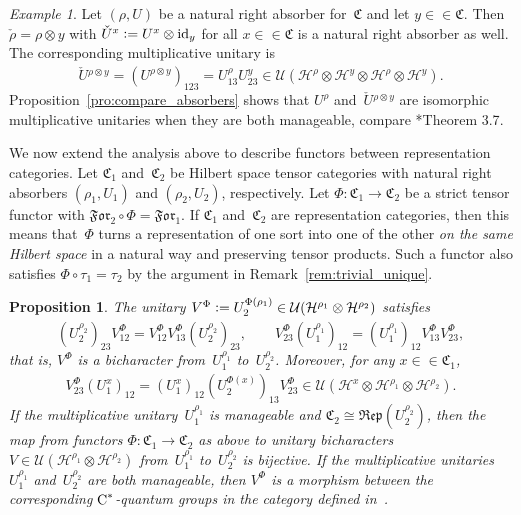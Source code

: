 \documentclass[a4paper]{amsart}
\numberwithin{equation}{section}
\theoremstyle{plain}
\numberwithin{theorem}{section}
\newtheorem{proposition}[theorem]{Proposition}
\theoremstyle{definition}
\theoremstyle{remark}
\newtheorem{example}[theorem]{Example}
\newcommand*{\inOb}{\mathrel{\in\in}}%
\newcommand*{\Cat}{\mathfrak C}     %
\newcommand*{\Corepcat}[1]{\mathfrak{Rep}(#1)}%
\newcommand*{\Forget}{\mathfrak{For}}%
\newcommand*{\Trivial}{\tau}%
\newcommand*{\nb}{\nobreakdash}
\newcommand*{\Id}{\textup{id}}%
\newcommand*{\Cst}{\textup C^*}%
\newcommand*{\Hils}[1][H]{\mathcal{#1}}%
\newcommand*{\U}{\mathcal U}%
\newcommand*{\defeq}{\mathrel{\vcentcolon=}}
\begin{document}
\begin{example}
  Let \((\rho,U)\) be a natural right absorber for~\(\Cat\) and let
  \(y\inOb\Cat\).  Then \(\check\rho = \rho\otimes y\) with
  \(\check{U}{}^x \defeq U^x \otimes \Id_y\) for all \(x\inOb\Cat\)
  is a natural right absorber as well.  The corresponding
  multiplicative unitary is
  \begin{equation}
    \label{eq:stabilise_multunit}
    \check{U}{}^{\rho\otimes y}
    = (U^{\rho\otimes y})^{\phantom1}_{123}
    = U^\rho_{13} U^y_{23}
    \in \U(\Hils^\rho\otimes\Hils^y \otimes \Hils^\rho\otimes\Hils^y).
  \end{equation}
  Proposition~\ref{pro:compare_absorbers} shows that \(U^\rho\)
  and~\(\check{U}{}^{\rho\otimes y}\)
  are isomorphic multiplicative unitaries when they are both
  manageable, compare \cite{Meyer-Roy-Woronowicz:Qgrp_proj}*{Theorem
    3.7}.
\end{example}

We now extend the analysis above to describe functors between
representation categories.
Let \(\Cat_1\)
and~\(\Cat_2\)
be Hilbert space tensor categories with natural right absorbers
\((\rho_1,U_1)\)
and \((\rho_2,U_2)\),
respectively.  Let \(\Phi\colon \Cat_1\to\Cat_2\)
be a strict tensor functor with \(\Forget_2\circ \Phi=\Forget_1\).
If \(\Cat_1\)
and~\(\Cat_2\)
are representation categories, then this means that~\(\Phi\)
turns a representation of one sort into one of the other \emph{on
  the same Hilbert space} in a natural way and preserving tensor
products.
Such a functor also satisfies \(\Phi\circ\Trivial_1 = \Trivial_2\)
by the argument in Remark~\ref{rem:trivial_unique}.

\begin{proposition}
  \label{pro:functor_Corep_morphism}
  The unitary
  \(V^\Phi \defeq U_2^{\Phi(\rho_1)}\in
  \U(\Hils^{\rho_1}\otimes\Hils^{\rho_2})\) satisfies
  \[
  (U_2^{\rho_2})^{\phantom1}_{23} V^\Phi_{12}
  = V^\Phi_{12} V^\Phi_{13} (U_2^{\rho_2})^{\phantom1}_{23},\qquad
  V^\Phi_{23} (U_1^{\rho_1})^{\phantom1}_{12}
  = (U_1^{\rho_1})^{\phantom1}_{12} V^\Phi_{13} V^\Phi_{23},
  \]
  that is, \(V^\Phi\) is a bicharacter from~\(U_1^{\rho_1}\)
  to~\(U_2^{\rho_2}\).  Moreover, for
  any \(x\inOb\Cat_1\),
  \begin{equation}
    \label{eq:functor_Corep_morphism}
    V^\Phi_{23} (U_1^x)^{\phantom1}_{12}
    = (U_1^x)^{\phantom1}_{12} (U_2^{\Phi(x)})^{\phantom1}_{13} V^\Phi_{23}
    \in \U(\Hils^x\otimes\Hils^{\rho_1}\otimes\Hils^{\rho_2}).
  \end{equation}
  If the multiplicative unitary~\(U_1^{\rho_1}\)
  is manageable and \(\Cat_2 \cong \Corepcat{U_2^{\rho_2}}\),
  then the map from functors \(\Phi\colon \Cat_1\to \Cat_2\)
  as above to unitary bicharacters
  \(V\in \U(\Hils^{\rho_1}\otimes\Hils^{\rho_2})\)
  from~\(U_1^{\rho_1}\)
  to~\(U_2^{\rho_2}\)
  is bijective.  If the multiplicative unitaries \(U_1^{\rho_1}\)
  and~\(U_2^{\rho_2}\)
  are both manageable, then \(V^\Phi\)
  is a morphism between the corresponding \(\Cst\)\nb-quantum
  groups in the category defined
  in~\textup{\cite{Meyer-Roy-Woronowicz:Homomorphisms}}.
\end{proposition}
\end{document}

